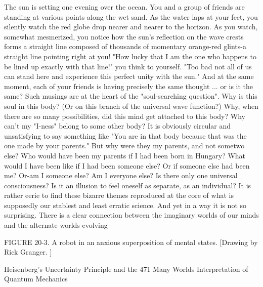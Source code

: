         The sun is setting one evening over the ocean. You and a group of friends are
standing at various points along the wet sand. As the water laps at your feet, you
silently watch the red globe drop nearer and nearer to the horizon. As you watch,
somewhat mesmerized, you notice how the sun's reflection on the wave crests forms a
straight line composed of thousands of momentary orange-red glints-a straight line
pointing right at you! "How lucky that I am the one who happens to be lined up
exactly with that line!" you think to yourself. "Too bad not all of us can stand here
and experience this perfect unity with the sun." And at the same moment, each of your
friends is having precisely the same thought ... or is it the same?
        Such musings are at the heart of the "soul-searching question". Why is this
soul in this body? (Or on this branch of the universal wave function?) Why, when
there are so many possibilities, did this mind get attached to this body? Why can't my
"I-ness" belong to some other body? It is obviously circular and unsatisfying to say
something like "You are in that body because that was the one made by your parents."
But why were they my parents, and not sometwo else? Who would have been my
parents if I had been born in Hungary? What would I have been like if I had been
someone else? Or if someone else had been me? Or-am I someone else? Am I
everyone else? Is there only one universal consciousness? Is it an illusion to feel
oneself as separate, as an individual? It is rather eerie to find these bizarre themes
reproduced at the core of what is supposedly our stablest and least erratic science.
        And yet in a way it is not so surprising. There is a clear connection between
the imaginary worlds of our minds and the alternate worlds evolving

FIGURE 20-3. A robot in an anxious superposition of mental states. [Drawing by
Rick Granger. ]




Heisenberg's Uncertainty Principle and the                                        471
Many Worlds Interpretation of Quantum Mechanics

